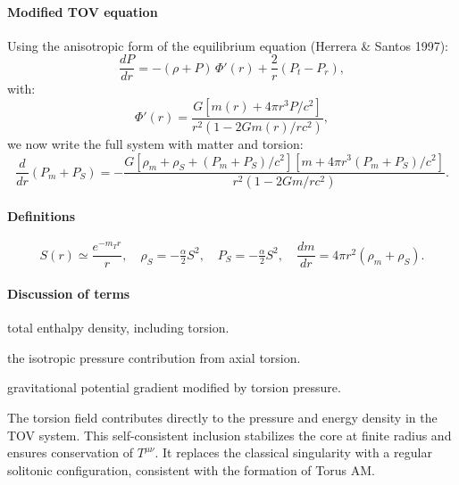 \documentclass{article}
\begin{document}
\paragraph{Modified TOV equation}
Using the anisotropic form of the equilibrium equation (Herrera \& Santos 1997):
\begin{equation}\label{eq:TOV-EC}
  \frac{dP}{dr}
    = -(\rho + P)\,\Phi'(r)
      + \frac{2}{r}(P_t - P_r),
\end{equation}
with:
\begin{equation}\label{eq:auto15}
\Phi'(r)
  = \frac{G \left[m(r) + 4\pi r^3 P/c^2\right]}
         {r^2 \left(1 - 2Gm(r)/rc^2\right)},
\end{equation}
we now write the full system with matter and torsion:
\begin{equation}\label{eq:auto16}
\frac{d}{dr} \left(P_m + P_S\right) =
  -\frac{G \left[\rho_m + \rho_S + (P_m + P_S)/c^2\right] \left[m + 4\pi r^3(P_m + P_S)/c^2\right]}
         {r^2 \left(1 - 2Gm/rc^2\right)}.
\end{equation}

\paragraph{Definitions}
\begin{equation}\label{eq:auto17}
S(r) \simeq \frac{e^{-m_T r}}{r},
  \quad
  \rho_S = -\tfrac{\alpha}{2} S^2,
  \quad
  P_S = -\tfrac{\alpha}{2} S^2,
  \quad
  \frac{dm}{dr} = 4\pi r^2 (\rho_m + \rho_S).
\end{equation}

\paragraph{Discussion of terms}
\begin{description}[leftmargin=2em]
  \item[\(\rho c^2 + P\)] total enthalpy density, including torsion.
  \item[\(P_r = P_t = -\frac{\alpha}{2} S^2\)] the isotropic pressure contribution from axial torsion.
  \item[\(\Phi'(r)\)] gravitational potential gradient modified by torsion pressure.
  \item[Physical consequences]  
    The torsion field contributes directly to the pressure and energy density in the TOV system. This self-consistent inclusion stabilizes the core at finite radius and ensures conservation of $T^{\mu\nu}$. It replaces the classical singularity with a regular solitonic configuration, consistent with the formation of Torus AM.
\end{description}
\end{document}
